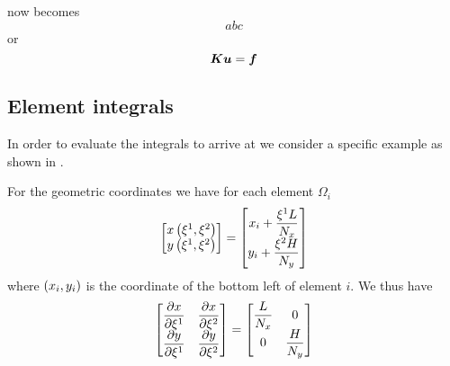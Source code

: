  now becomes
\begin{equation}
abc  
\end{equation}
or
\begin{equation}
  \matr{K}\vectr{u}=\vectr{f}
  \label{eqn:FEMTwoDLaplaceMatrixEquation}
\end{equation}

\subsection{Element integrals}
\label{subsec:FEMTwoDLaplaceElementIntegrals}

In order to evaluate the integrals to arrive at
 we consider a specific
example as shown in .


For the geometric coordinates we have for each element $\Omega_{i}$
\begin{equation}
  \begin{bmatrix}
     x\left( \xi^{1},\xi^{2} \right)  \\
     y\left( \xi^{1},\xi^{2} \right) 
  \end{bmatrix}= \begin{bmatrix}
    x_{i}+\dfrac{\xi^{1} L}{N_{x}} \\
    y_{i}+\dfrac{\xi^{2} H}{N_{y}}  
  \end{bmatrix}
\end{equation}
where $\left( x_{i},y_{i} \right)$ is the coordinate of the bottom left of element $i$. We thus have
\begin{equation}
  \begin{bmatrix}
     \dfrac{\partial x}{\partial \xi^{1}}  &  \dfrac{\partial x}{\partial \xi^{2}}  \\
     \dfrac{\partial y}{\partial \xi^{1}}  &  \dfrac{\partial y}{\partial \xi^{2}}      
  \end{bmatrix} = \begin{bmatrix}
    \dfrac{L}{N_{x}} & 0 \\
    0 & \dfrac{H}{N_{y}}
  \end{bmatrix}
\end{equation}

